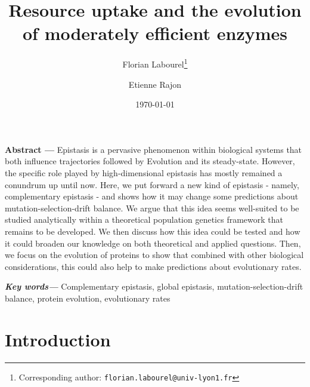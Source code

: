\documentclass[11pt,onecolumn]{article}
\providecommand{\keywords}[1]{\textbf{\textit{Key words---}} #1}
\renewcommand{\abstract}[1]{\textbf{Abstract --- } #1}
\begin{document}
\title{Resource uptake and the evolution of moderately efficient enzymes}
\date{\today}
\author[,1]{Florian Labourel\thanks{Corresponding author: \texttt{florian.labourel@univ-lyon1.fr}}}
\author[1]{Etienne Rajon}

 

  \maketitle
    
    \abstract{Epistasis is a pervasive phenomenon within biological systems that both influence trajectories followed by Evolution and its steady-state. However, the specific role played by high-dimensional epistasis has mostly remained a conundrum up until now. Here, we put forward a new kind of epistasis - namely, complementary epistasis - and shows how it may change some predictions about mutation-selection-drift balance. We argue that this idea seems well-suited to be studied analytically within a theoretical population genetics framework that remains to be developed. We then discuss how this idea could be tested and how it could broaden our knowledge on both theoretical and applied questions. Then, we focus on the evolution of proteins to show that combined with other biological considerations, this could also help to make predictions about evolutionary rates.}

\keywords{Complementary epistasis, global epistasis, mutation-selection-drift balance, protein evolution, evolutionary rates}
\vspace{0.5cm}

\section{{Introduction}\label{sec:Intro}}
\end{document}

